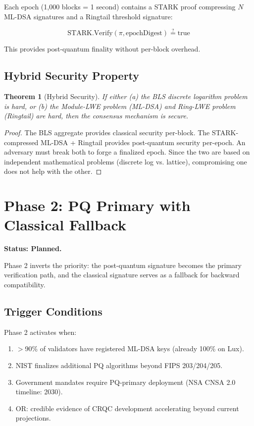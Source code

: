 \documentclass[11pt,a4paper]{article}
\newtheorem{theorem}{Theorem}[section]
\begin{document}
Each epoch (1,000 blocks = 1 second) contains a STARK proof compressing $N$ ML-DSA signatures and a Ringtail threshold signature:

$$\text{STARK.Verify}(\pi, \text{epochDigest}) \stackrel{?}{=} \text{true}$$

This provides post-quantum finality without per-block overhead.

\subsection{Hybrid Security Property}

\begin{theorem}[Hybrid Security]
If either (a) the BLS discrete logarithm problem is hard, or (b) the Module-LWE problem (ML-DSA) and Ring-LWE problem (Ringtail) are hard, then the consensus mechanism is secure.
\end{theorem}

\begin{proof}
The BLS aggregate provides classical security per-block. The STARK-compressed ML-DSA + Ringtail provides post-quantum security per-epoch. An adversary must break both to forge a finalized epoch. Since the two are based on independent mathematical problems (discrete log vs. lattice), compromising one does not help with the other.
\end{proof}

\section{Phase 2: PQ Primary with Classical Fallback}

\textbf{Status: Planned.}

Phase 2 inverts the priority: the post-quantum signature becomes the primary verification path, and the classical signature serves as a fallback for backward compatibility.

\subsection{Trigger Conditions}

Phase 2 activates when:
\begin{enumerate}[leftmargin=2em]
\item $>$90\% of validators have registered ML-DSA keys (already 100\% on Lux).
\item NIST finalizes additional PQ algorithms beyond FIPS 203/204/205.
\item Government mandates require PQ-primary deployment (NSA CNSA 2.0 timeline: 2030).
\item OR: credible evidence of CRQC development accelerating beyond current projections.
\end{enumerate}
\end{document}

